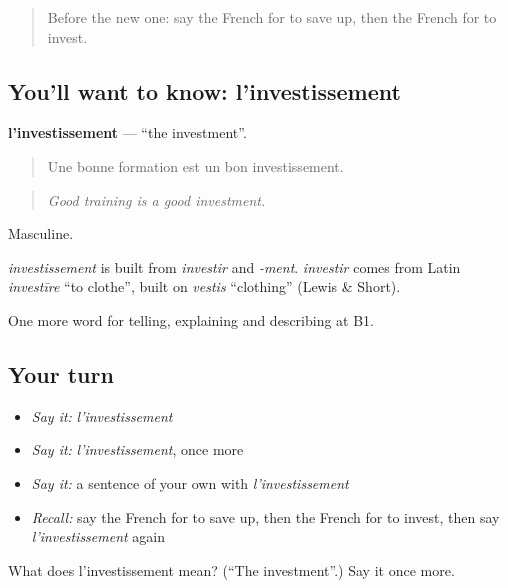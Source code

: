 \begin{quote}
Before the new one: say the French for to save up, then the French for to invest.
\end{quote}

\subsection*{You'll want to know: l'investissement}
\textbf{l'investissement} — \textquotedblleft{}the investment\textquotedblright{}.

\begin{quote}
Une bonne formation est un bon investissement.
\end{quote}

\begin{quote}
\emph{Good training is a good investment.}
\end{quote}

Masculine.

\begin{cousinweb}
\emph{investissement} is built from \emph{investir} and \emph{-ment}. \emph{investir} comes from Latin \emph{investīre} \textquotedblleft{}to clothe\textquotedblright{}, built on \emph{vestis} \textquotedblleft{}clothing\textquotedblright{} (Lewis \& Short).
\end{cousinweb}

\begin{grammarlens}[title={What you've built}]
One more word for telling, explaining and describing at B1.
\end{grammarlens}

\subsection*{Your turn}
\begin{itemize}
\raggedright
  \item \emph{Say it:} \emph{l'investissement}
  \item \emph{Say it:} \emph{l'investissement}, once more
  \item \emph{Say it:} a sentence of your own with \emph{l'investissement}
  \item \emph{Recall:} say the French for to save up, then the French for to invest, then say \emph{l'investissement} again
\end{itemize}

\begin{tcolorbox}[breakable,colback=teal!4,colframe=teal!35!black,title={Before you move on}]
What does l'investissement mean? (\textquotedblleft{}The investment\textquotedblright{}.) Say it once more.
\end{tcolorbox}
